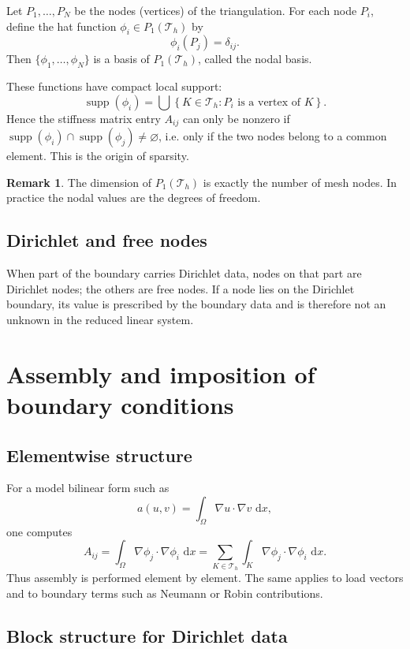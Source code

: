 \documentclass[11pt]{article}
\theoremstyle{definition}
\newtheorem{remark}[theorem]{Remark}
\newcommand{\grad}{\nabla}
\newcommand{\dd}{\,\mathrm{d}}
\newcommand{\set}[1]{\left\{ #1\right\}}
\DeclareMathOperator{\supp}{supp}
\begin{document}
Let $P_1,\dots,P_N$ be the nodes (vertices) of the triangulation. For each node $P_i$, define the hat function $\phi_i\in P_1(\mathcal{T}_h)$ by
\[
\phi_i(P_j)=\delta_{ij}.
\]
Then $\{\phi_1,\dots,\phi_N\}$ is a basis of $P_1(\mathcal{T}_h)$, called the nodal basis.

These functions have compact local support:
\[
\supp(\phi_i)=\bigcup \set{K\in\mathcal{T}_h : P_i \text{ is a vertex of } K}.
\]
Hence the stiffness matrix entry $A_{ij}$ can only be nonzero if $\supp(\phi_i)\cap\supp(\phi_j)\neq\varnothing$, i.e. only if the two nodes belong to a common element. This is the origin of sparsity.

\begin{remark}
The dimension of $P_1(\mathcal{T}_h)$ is exactly the number of mesh nodes. In practice the nodal values are the degrees of freedom.
\end{remark}

\subsection{Dirichlet and free nodes}

When part of the boundary carries Dirichlet data, nodes on that part are Dirichlet nodes; the others are free nodes. If a node lies on the Dirichlet boundary, its value is prescribed by the boundary data and is therefore not an unknown in the reduced linear system.

\section{Assembly and imposition of boundary conditions}

\subsection{Elementwise structure}

For a model bilinear form such as
\[
a(u,v)=\int_\Omega \grad u\cdot\grad v\,\dd x,
\]
one computes
\[
A_{ij}=\int_\Omega \grad\phi_j\cdot\grad\phi_i\,\dd x
= \sum_{K\in\mathcal{T}_h} \int_K \grad\phi_j\cdot\grad\phi_i\,\dd x.
\]
Thus assembly is performed element by element. The same applies to load vectors and to boundary terms such as Neumann or Robin contributions.

\subsection{Block structure for Dirichlet data}
\end{document}
